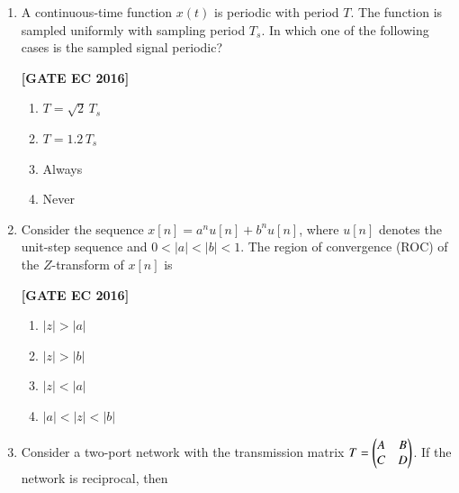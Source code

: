 \documentclass[12pt]{article}
\begin{document}
\begin{enumerate}[label=\textbf{Q.\arabic*.}, start=6, itemsep=2em]
\begin{enumerate}[label=\textbf{Q.\arabic*.}]
\noindent \textbf{[GATE EC 2016]}

\begin{multicols}{2}
\begin{enumerate}[label=\alph*.]
    \item $e^{j\omega_0 t} u(t)$
    \item $\cos(\omega_0 t)$
    \item $e^{j\omega_0 t}$
    \item $\sin(\omega_0 t)$
\end{enumerate}
\end{multicols}

\item A continuous-time function $x(t)$ is periodic with period $T$. The function is sampled uniformly with sampling period $T_s$. In which one of the following cases is the sampled signal periodic?

\noindent \textbf{[GATE EC 2016]}

\begin{multicols}{2}
\begin{enumerate}[label=\alph*.]
    \item $T = \sqrt{2}\,T_s$
    \item $T = 1.2\,T_s$
    \item Always
    \item Never
\end{enumerate}
\end{multicols}

\item Consider the sequence $x[n]=a^n u[n]+b^n u[n]$, where $u[n]$ denotes the unit-step sequence and $0<|a|<|b|<1$. The region of convergence (ROC) of the $Z$-transform of $x[n]$ is

\noindent \textbf{[GATE EC 2016]}

\begin{multicols}{2}
\begin{enumerate}[label=\alph*.]
    \item $|z|>|a|$
    \item $|z|>|b|$
    \item $|z|<|a|$
    \item $|a|<|z|<|b|$
\end{enumerate}
\end{multicols}

\item Consider a two-port network with the transmission matrix $T=\begin{pmatrix}A & B\\ C & D\end{pmatrix}$. If the network is reciprocal, then


\end{enumerate}
\end{enumerate}
\end{document}
